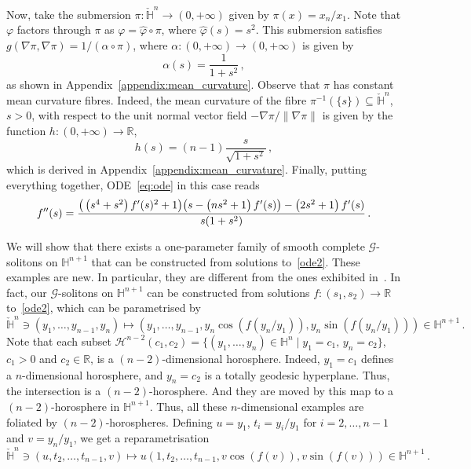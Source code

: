 \documentclass[oneside,12pt]{amsart}
\theoremstyle{definition}
\newcommand{\R}{\mathbb{R}}
\begin{document}
    Now, take the submersion $\pi \colon \check{\mathbb{H}}^n \to (0, +\infty)$ given by $\pi(x) = x_n / x_1$. Note that $\varphi$ factors through $\pi$ as $\varphi = \widehat{\varphi} \circ \pi$, where $\widehat{\varphi}(s) = s^2$.  This submersion satisfies $g \left( \nabla \pi , \nabla \pi \right) = 1/\left(\alpha \circ \pi\right)$, where $\alpha \colon (0,+\infty) \to (0 , +\infty)$ is given by
    \begin{equation}\label{eq:alpha} 
    \alpha(s) = \frac{1}{1+s^2} \, ,   
    \end{equation}
    as shown in Appendix~\ref{appendix:mean_curvature}. Observe that $\pi$ has constant mean curvature fibres. Indeed, the mean curvature of the fibre $\pi^{-1 }(\{s\}) \subseteq \check{\mathbb{H}}^n$, $s>0$, with respect to the unit normal vector field $- \nabla \pi / \lVert \nabla \pi \rVert$ is given by the function $h \colon (0,+\infty) \to \R$,
     \begin{equation} \label{eq:mean_curvature}
         h(s) = (n-1) \frac{s}{\sqrt{1+s^2}} \, , 
     \end{equation} 
    which is derived in Appendix~\ref{appendix:mean_curvature}. Finally, putting everything together, ODE~\eqref{eq:ode} in this case reads 
    \begin{equation} \label{ode2}
        f''(s) = \frac{\big(\left(s^4+s^2\right) f'(s)^2+1\big) \big(s-\left(n s^2+1\right) f'(s)\big)-\left(2 s^2+1\right) f'(s)}{s(1+s^2)} \, . \\ 
    \end{equation}

We will show that there exists a one-parameter family of smooth complete $\mathcal{G}$-solitons on $\mathbb{H}^{n+1}$ that can be constructed from solutions to~\eqref{ode2}. These examples are new. In particular, they are different from the ones exhibited in~\cite{LRS}. In fact, our  $\mathcal{G}$-solitons on $\mathbb{H}^{n+1}$ can be constructed from solutions $f \colon (s_1 , s_2) \to \mathbb{R}$ to~\eqref{ode2}, which can be parametrised by
\[
\check{\mathbb{H}}^{n} \ni \left(y_1 , \dots , y_{n-1}, y_n \right) \mapsto \left( y_1 , \dots , y_{n-1}, y_n \cos\left( f(y_n/y_1) \right), y_n \sin\left( f(y_n/y_1) \right) \right) \in \mathbb{H}^{n+1} \, .
\]
Note that each subset $\mathcal{H}^{n-2}(c_1,c_2)=\{(y_1,\ldots,y_n)\in \mathbb{H}^{n} \mid y_1=c_1, \, y_n=c_2\}$, $c_1>0$ and $c_2\in\mathbb{R}$, is a $(n-2)$-dimensional horosphere. Indeed, $y_1=c_1$ defines a $n$-dimensional horosphere, and $y_n=c_2$ is a totally geodesic hyperplane. Thus, the intersection is a $(n-2)$-horosphere. And they are moved by this map to a $(n-2)$-horosphere in $\mathbb{H}^{n+1}$. Thus, all these $n$-dimensional examples are foliated by $(n-2)$-horospheres.
Defining $u = y_1$, $t_i = y_i / y_1$ for $i = 2 , \dots , n-1$ and $v = y_n / y_1$, we get a reparametrisation
\[
\check{\mathbb{H}}^{n} \ni \left(u , t_2 , \dots , t_{n-1}, v \right) \mapsto u \left( 1 , t_2 , \dots , t_{n-1}, v \cos\left( f(v) \right), v \sin\left( f(v) \right) \right) \in \mathbb{H}^{n+1} \, .
\]
\end{document}
